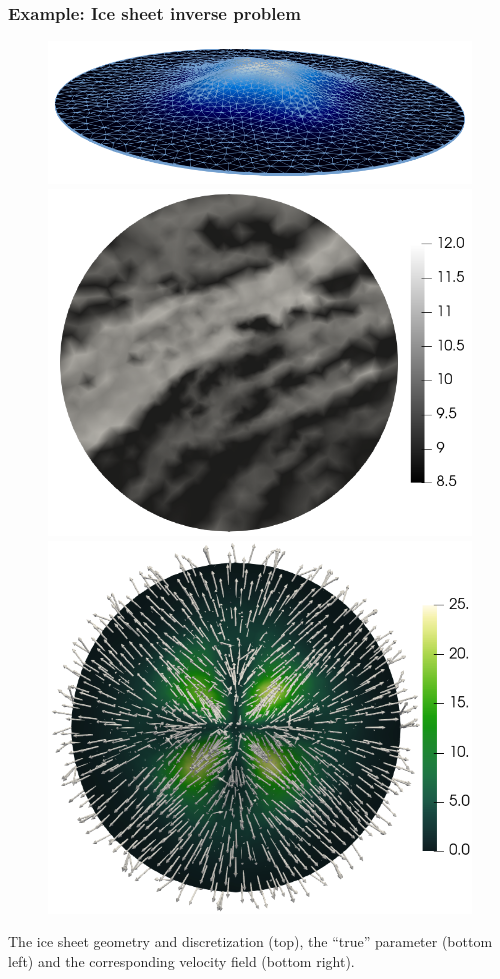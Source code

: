 \documentclass[10pt,final,xcolor=dvipsnames]{beamer}
\begin{document}
\begin{frame}
  \frametitle{Example: Ice sheet inverse problem}

  \begin{figure}
	\centering\includegraphics[scale=0.22]{figures/meshHeight_view2_edges.png}\\
	\includegraphics[scale=0.18]{figures/mtrue_withColorBar.png}
	\includegraphics[scale=0.18]{figures/trueVelocity2_glyphs.png}
  \end{figure}
  \begin{center}
    The ice sheet geometry and discretization (top), the ``true''
    parameter (bottom left) and the corresponding velocity field
    (bottom right).
  \end{center}
\end{frame}
\end{document}
